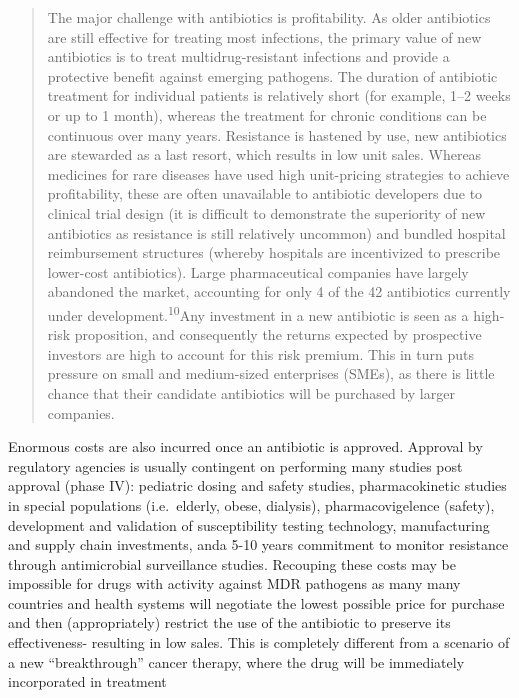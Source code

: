 \documentclass[
]{book}
\begin{document}
\begin{quote}
The major challenge with antibiotics is profitability. As older antibiotics are still effective for treating most infections, the primary value of new antibiotics is to treat multidrug-resistant infections and provide a protective benefit against emerging pathogens. The duration of antibiotic treatment for individual patients is relatively short (for example, 1--2 weeks or up to 1 month), whereas the treatment for chronic conditions can be continuous over many years. Resistance is hastened by use, new antibiotics are stewarded as a last resort, which results in low unit sales. Whereas medicines for rare diseases have used high unit-pricing strategies to achieve profitability, these are often unavailable to antibiotic developers due to clinical trial design (it is difficult to demonstrate the superiority of new antibiotics as resistance is still relatively uncommon) and bundled hospital reimbursement structures (whereby hospitals are incentivized to prescribe lower-cost antibiotics). Large pharmaceutical companies have largely abandoned the market, accounting for only 4 of the 42 antibiotics currently under development.\textsuperscript{10}Any investment in a new antibiotic is seen as a high-risk proposition, and consequently the returns expected by prospective investors are high to account for this risk premium. This in turn puts pressure on small and medium-sized enterprises (SMEs), as there is little chance that their candidate antibiotics will be purchased by larger companies.
\end{quote}

Enormous costs are also incurred once an antibiotic is approved. Approval by regulatory agencies is usually contingent on performing many studies post approval (phase IV): pediatric dosing and safety studies, pharmacokinetic studies in special populations (i.e.~elderly, obese, dialysis), pharmacovigelence (safety), development and validation of susceptibility testing technology, manufacturing and supply chain investments, anda 5-10 years commitment to monitor resistance through antimicrobial surveillance studies. Recouping these costs may be impossible for drugs with activity against MDR pathogens as many many countries and health systems will negotiate the lowest possible price for purchase and then (appropriately) restrict the use of the antibiotic to preserve its effectiveness- resulting in low sales. This is completely different from a scenario of a new ``breakthrough'' cancer therapy, where the drug will be immediately incorporated in treatment
\end{document}
